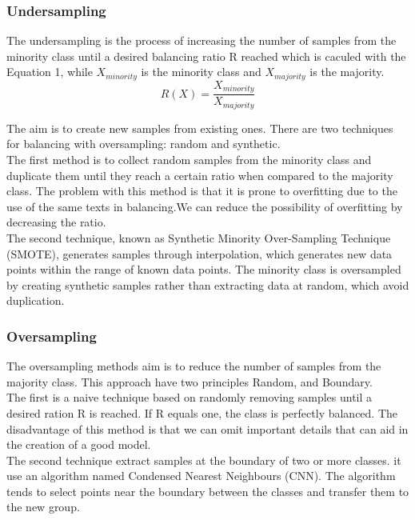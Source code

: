 \documentclass[conference]{IEEEtran}
\begin{document}
	\subsubsection{Undersampling}
	The undersampling is the process of increasing the number of samples from the minority class until a desired balancing ratio R reached which is  caculed with the Equation 1, while $X_{minority}$ is the minority class and $X_{majority}$ is the majority.
	\begin{equation}
	R(X)= \frac{X_{minority}}{X_{majority}}
	\end{equation}
	
	The aim is to create new samples from existing ones. There are two techniques for balancing with oversampling: random and synthetic.\\
	The first method is to collect random samples from the minority class and duplicate them until they reach a certain ratio when compared to the majority class. The problem with this method is that it is prone to overfitting due to the use of the same texts in balancing.We can reduce the possibility of overfitting by decreasing the ratio. \\
	
	The second technique, known as Synthetic Minority Over-Sampling Technique (SMOTE), generates samples through interpolation, which generates new data points within the range of known data points.
	The minority class is oversampled by creating synthetic samples rather than extracting data at random, which avoid duplication.\\
	
	\subsubsection{Oversampling}
	The oversampling method\textquotesingle s aim is to reduce the number of samples from the majority class. This approach have two principles Random, and Boundary.\\
	
	The first is a naive technique based on randomly removing samples until a desired ration R is reached. If R equals one, the class is perfectly balanced. The disadvantage of this method is that we can omit important details that can aid in the creation of a good model.\\
	
	The second technique extract samples at the boundary of two or more classes. it use an algorithm named Condensed Nearest Neighbours (CNN). The algorithm tends to select points near the boundary between the classes and transfer them to the new group. 
	
\end{document}
